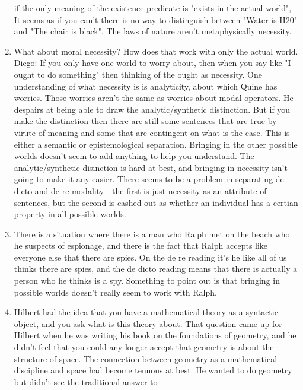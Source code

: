 \documentclass[12pt]{article}
\theoremstyle{definition}
\begin{document}
\begin{enumerate}
        if the only meaning of the existence predicate is "exists in the actual
        world", It seems as if you can't there is no way to distinguish between
        "Water is H20" and "The chair is black". The laws of nature aren't
        metaphysically necessity.
    \item
        What about moral necessity? How does that work with only the actual
        world. Diego: If you only have one world to worry about, then when you
        say like "I ought to do something" then thinking of the ought as
        necessity. One understanding of what necessity is is analyticity, about
        which Quine has worries. Those worries aren't the same as worries about
        modal operators.  He despairs at being able to draw the
        analytic/synthetic distinction. But if you make the distinction then
        there are still some sentences that are true by virute of meaning and
        some that are contingent on what is the case. This is either a semantic
        or epistemological separation. Bringing in the other possible worlds
        doesn't seem to add anything to help you understand. The
        analytic/synthetic disinction is hard at best, and bringing in
        necessity isn't going to make it any easier. There seems to be a
        problem in separating de dicto and de re modality - the first is just
        necessity as an attribute of sentences, but the second is cashed out as
        whether an individual has a certian property in all possible worlds.
    \item
        There is a situation where there is a man who Ralph met on the beach
        who he suspects of espionage, and there is the fact that Ralph accepts
        like everyone else that there are spies. On the de re reading it's he
        like all of us thinks there are spies, and the de dicto reading means
        that there is actually a person who he thinks is a spy. Something to
        point out is that bringing in possible worlds doesn't really seem to
        work with Ralph.
    \item
        Hilbert had the idea that you have a mathematical theory as a syntactic
        object, and you ask what is this theory about. That question came up
        for Hilbert when he was writing his book on the foundations of
        geometry, and he didn't feel that you could any longer accept that
        geometry is about the structure of space. The connection between
        geometry as a mathematical discipline and space had become tenuous at
        best. He wanted to do geometry but didn't see the traditional answer to

\end{enumerate}
\end{document}

